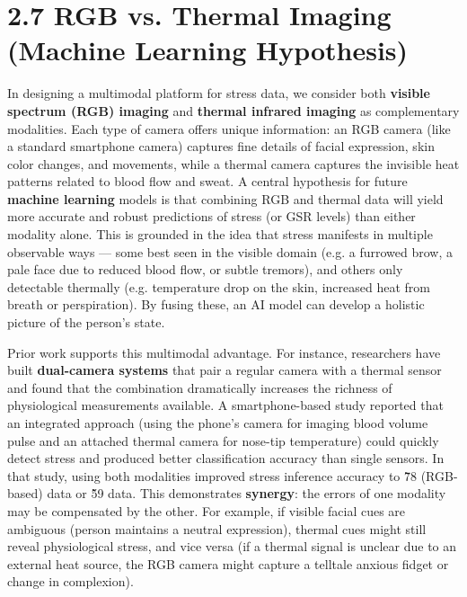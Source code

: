 \documentclass[11pt,a4paper]{report}
\begin{document}
\section{2.7 RGB vs. Thermal Imaging (Machine Learning Hypothesis)}

In designing a multimodal platform for stress data, we consider both
\textbf{visible spectrum (RGB) imaging} and \textbf{thermal infrared imaging} as
complementary modalities. Each type of camera offers unique information:
an RGB camera (like a standard smartphone camera) captures fine details
of facial expression, skin color changes, and movements, while a thermal
camera captures the invisible heat patterns related to blood flow and
sweat. A central hypothesis for future \textbf{machine learning} models is
that combining RGB and thermal data will yield more accurate and robust
predictions of stress (or GSR levels) than either modality alone. This
is grounded in the idea that stress manifests in multiple observable
ways --- some best seen in the visible domain (e.g. a furrowed brow, a
pale face due to reduced blood flow, or subtle tremors), and others only
detectable thermally (e.g. temperature drop on the skin, increased heat
from breath or perspiration). By fusing these, an AI model can develop a
holistic picture of the person's state.

Prior work supports this multimodal advantage. For instance, researchers
have built \textbf{dual-camera systems} that pair a regular camera with a
thermal sensor and found that the combination dramatically increases the
richness of physiological measurements
available\cite{InstantStressSmartphone2019}.
A smartphone-based study reported that an integrated approach (using the
phone's camera for imaging blood volume pulse and an attached thermal
camera for nose-tip temperature) could quickly detect stress and
produced better classification accuracy than single
sensors\cite{InstantStressSmartphone2019}\cite{InstantStressSmartphone2019}.
In that study, using both modalities improved stress inference accuracy
to \~78%
(RGB-based) data or \~59%
data\cite{InstantStressSmartphone2019}.
This demonstrates \textbf{synergy}: the errors of one modality may be
compensated by the other. For example, if visible facial cues are
ambiguous (person maintains a neutral expression), thermal cues might
still reveal physiological stress, and vice versa (if a thermal signal
is unclear due to an external heat source, the RGB camera might capture
a telltale anxious fidget or change in complexion).
\end{document}
